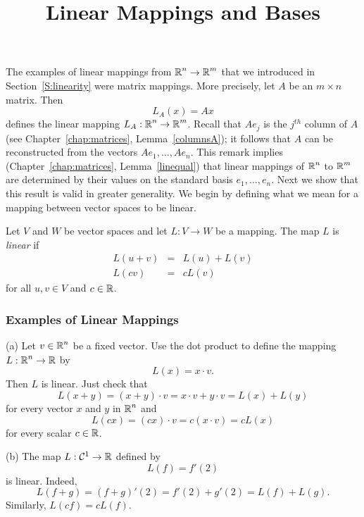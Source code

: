 \documentclass{ximera}
\title{Linear Mappings and Bases}
\begin{document}
\begin{abstract}
\end{abstract}
\maketitle

\label{Sect:linmap}

The examples of linear mappings
 from $\mbox{$\Bbb{R}$}^n\to\mbox{$\Bbb{R}$}^m$ that we introduced in
Section~\ref{S:linearity} were matrix mappings.  More precisely,
let $A$ be an $m\times n$ matrix.  Then
\[
L_A(x)=Ax
\]
defines the linear mapping $L_A:\mbox{$\Bbb{R}$}^n\to\mbox{$\Bbb{R}$}^m$.  Recall that $Ae_j$
is the $j^{th}$ column of $A$ (see Chapter~\ref{chap:matrices},
Lemma~\ref{columnsA}); it follows that $A$ can be
reconstructed from the vectors $Ae_1,\ldots,Ae_n$.  This remark
implies (Chapter~\ref{chap:matrices}, Lemma~\ref{linequal}) that
linear mappings of $\mbox{$\Bbb{R}$}^n$ to $\mbox{$\Bbb{R}$}^m$ are determined by their
values on the standard basis $e_1, \ldots, e_n$.  Next we show
that this result is valid in greater generality.  We begin by
defining what we mean for a mapping between vector spaces to be
linear.

\begin{definition}  \label{D:linearV}
Let $V$ and $W$ be vector spaces and let $L:V\to W$ be a mapping.  The map
$L$ is {\em linear\/} if
\begin{eqnarray*}
L(u+v) & = & L(u) + L(v) \\
L(cv) & = & cL(v)
\end{eqnarray*}
for all $u,v\in V$ and $c\in\mbox{$\Bbb{R}$}$.
\end{definition} 

\subsubsection*{Examples of Linear Mappings}

\noindent (a) Let $v\in\mbox{$\Bbb{R}$}^n$ be a fixed vector.  Use the
dot product to define the mapping
$L:\mbox{$\Bbb{R}$}^n\to\mbox{$\Bbb{R}$}$ by
\[
L(x)= x\cdot v.
\]
Then $L$ is linear.  Just check that
\[
L(x+y) = (x+y)\cdot v = x\cdot v + y\cdot v = L(x) + L(y)
\]
for every vector $x$ and $y$ in $\mbox{$\Bbb{R}$}^n$ and
\[
L(cx) = (cx)\cdot v = c(x\cdot v) = cL(x)
\]
for every scalar $c\in\mbox{$\Bbb{R}$}$.

\noindent (b) The map $L:{\cal C}^1\to\mbox{$\Bbb{R}$}$ defined by
\[
L(f) = f'(2)
\]
is linear.  Indeed,
\[
L(f+g) = (f+g)'(2) = f'(2) + g'(2) = L(f) + L(g).
\]
Similarly, $L(cf)=cL(f)$.
\end{document}

